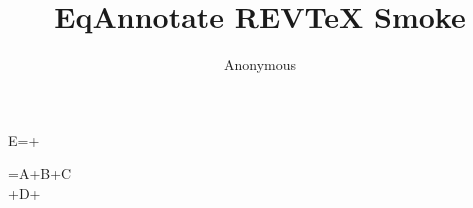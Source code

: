 \documentclass[reprint,amsmath,amssymb]{revtex4-2}
\begin{document}
\title{EqAnnotate REVTeX Smoke}\author{Anonymous}\maketitle
\begin{annotatedequation}[numbered]
E=+\label{eq:rev}
\end{annotatedequation}

\begin{annotatedmultline}
=A+B+C\\
{}+D+
\end{annotatedmultline}
\end{document}
